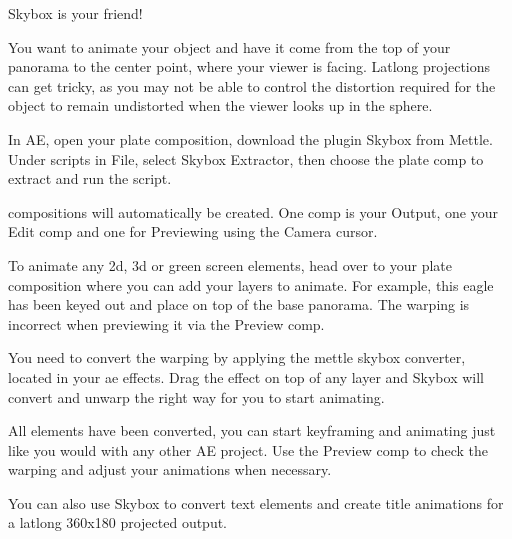 \begin{fullwidth}
\clearpage
{\large Skybox is your friend! \par}

You want to animate your object and have it come from the top of your panorama to the center point, where your viewer is facing. Latlong projections can get tricky, as you may not be able to control the distortion required for the object to remain undistorted when the viewer looks up in the sphere.

In AE, open your plate composition, download the plugin Skybox from Mettle. Under scripts in File, select Skybox Extractor, then choose the plate comp to extract and run the script.

 compositions will automatically be created. One comp is your Output, one your Edit comp and one for Previewing using the Camera cursor.


To animate any 2d, 3d or green screen elements, head over to your plate composition where you can add your layers to animate. For example, this eagle has been keyed out and place on top of the base panorama. The warping is incorrect when previewing it via the Preview comp. 


You need to convert the warping by applying the mettle skybox converter, located in your ae effects. Drag the effect on top of any layer and Skybox will convert and unwarp the right way for you to start animating. 


All elements have been converted, you can start keyframing and animating just like you would with any other AE project. Use the Preview comp to check the warping and adjust your animations when necessary. 


You can also use Skybox to convert text elements and create title animations for a latlong 360x180 projected output.


\clearpage
\end{fullwidth}